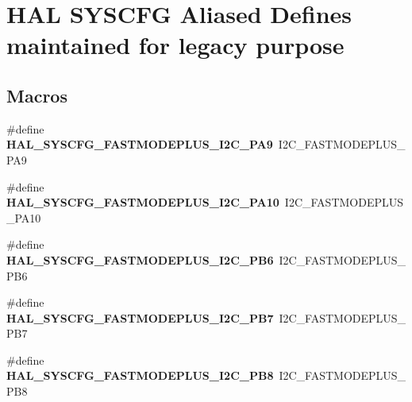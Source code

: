\hypertarget{group___h_a_l___s_y_s_c_f_g___aliased___defines}{\section{H\-A\-L S\-Y\-S\-C\-F\-G Aliased Defines maintained for legacy purpose}
\label{group___h_a_l___s_y_s_c_f_g___aliased___defines}
}
\subsection*{Macros}
\begin{DoxyCompactItemize}
\item 
\hypertarget{group___h_a_l___s_y_s_c_f_g___aliased___defines_gab49ca938ca8481b3bd783423f840c1bd}{\#define {\bfseries H\-A\-L\-\_\-\-S\-Y\-S\-C\-F\-G\-\_\-\-F\-A\-S\-T\-M\-O\-D\-E\-P\-L\-U\-S\-\_\-\-I2\-C\-\_\-\-P\-A9}~I2\-C\-\_\-\-F\-A\-S\-T\-M\-O\-D\-E\-P\-L\-U\-S\-\_\-\-P\-A9}\label{group___h_a_l___s_y_s_c_f_g___aliased___defines_gab49ca938ca8481b3bd783423f840c1bd}

\item 
\hypertarget{group___h_a_l___s_y_s_c_f_g___aliased___defines_ga51ca865a9860b7a43fbb46fb768e3657}{\#define {\bfseries H\-A\-L\-\_\-\-S\-Y\-S\-C\-F\-G\-\_\-\-F\-A\-S\-T\-M\-O\-D\-E\-P\-L\-U\-S\-\_\-\-I2\-C\-\_\-\-P\-A10}~I2\-C\-\_\-\-F\-A\-S\-T\-M\-O\-D\-E\-P\-L\-U\-S\-\_\-\-P\-A10}\label{group___h_a_l___s_y_s_c_f_g___aliased___defines_ga51ca865a9860b7a43fbb46fb768e3657}

\item 
\hypertarget{group___h_a_l___s_y_s_c_f_g___aliased___defines_ga615cfdee08ad61f7b1581775e4e0385e}{\#define {\bfseries H\-A\-L\-\_\-\-S\-Y\-S\-C\-F\-G\-\_\-\-F\-A\-S\-T\-M\-O\-D\-E\-P\-L\-U\-S\-\_\-\-I2\-C\-\_\-\-P\-B6}~I2\-C\-\_\-\-F\-A\-S\-T\-M\-O\-D\-E\-P\-L\-U\-S\-\_\-\-P\-B6}\label{group___h_a_l___s_y_s_c_f_g___aliased___defines_ga615cfdee08ad61f7b1581775e4e0385e}

\item 
\hypertarget{group___h_a_l___s_y_s_c_f_g___aliased___defines_gaacdf5fce976c3d425f3aac760f4dc90d}{\#define {\bfseries H\-A\-L\-\_\-\-S\-Y\-S\-C\-F\-G\-\_\-\-F\-A\-S\-T\-M\-O\-D\-E\-P\-L\-U\-S\-\_\-\-I2\-C\-\_\-\-P\-B7}~I2\-C\-\_\-\-F\-A\-S\-T\-M\-O\-D\-E\-P\-L\-U\-S\-\_\-\-P\-B7}\label{group___h_a_l___s_y_s_c_f_g___aliased___defines_gaacdf5fce976c3d425f3aac760f4dc90d}

\item 
\hypertarget{group___h_a_l___s_y_s_c_f_g___aliased___defines_gad8342aebd8090a8777d84165d5726b62}{\#define {\bfseries H\-A\-L\-\_\-\-S\-Y\-S\-C\-F\-G\-\_\-\-F\-A\-S\-T\-M\-O\-D\-E\-P\-L\-U\-S\-\_\-\-I2\-C\-\_\-\-P\-B8}~I2\-C\-\_\-\-F\-A\-S\-T\-M\-O\-D\-E\-P\-L\-U\-S\-\_\-\-P\-B8}\label{group___h_a_l___s_y_s_c_f_g___aliased___defines_gad8342aebd8090a8777d84165d5726b62}


\end{DoxyCompactItemize}
